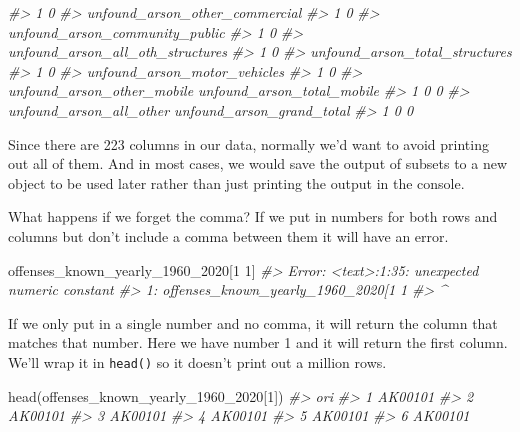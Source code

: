 \documentclass[
]{krantz}
\makeatletter
\newenvironment{Shaded}{\begin{snugshade}}{\end{snugshade}}
\newcommand{\CommentTok}[1]{\textcolor[rgb]{0.37,0.37,0.37}{\textit{#1}}}
\newcommand{\DecValTok}[1]{\textcolor[rgb]{0.06,0.06,0.06}{#1}}
\newcommand{\FunctionTok}[1]{\textcolor[rgb]{0,0,0}{#1}}
\newcommand{\NormalTok}[1]{#1}
\newenvironment{kframe}{%
\medskip{}
\setlength{\fboxsep}{.8em}
 \def\at@end@of@kframe{}%
 \ifinner\ifhmode%
  \def\at@end@of@kframe{\end{minipage}}%
  \begin{minipage}{\columnwidth}%
 \fi\fi%
 \def\FrameCommand##1{\hskip\@totalleftmargin \hskip-\fboxsep
 \colorbox{shadecolor}{##1}\hskip-\fboxsep
     \hskip-\linewidth \hskip-\@totalleftmargin \hskip\columnwidth}%
 \MakeFramed {\advance\hsize-\width
   \@totalleftmargin\z@ \linewidth\hsize
   \@setminipage}}%
 {\par\unskip\endMakeFramed%
 \at@end@of@kframe}
\renewenvironment{Shaded}{\begin{kframe}}{\end{kframe}}
\makeatother
\begin{document}
\begin{Shaded}
\begin{Highlighting}[]
\CommentTok{\#\textgreater{} 1                        0}
\CommentTok{\#\textgreater{}   unfound\_arson\_other\_commercial}
\CommentTok{\#\textgreater{} 1                              0}
\CommentTok{\#\textgreater{}   unfound\_arson\_community\_public}
\CommentTok{\#\textgreater{} 1                              0}
\CommentTok{\#\textgreater{}   unfound\_arson\_all\_oth\_structures}
\CommentTok{\#\textgreater{} 1                                0}
\CommentTok{\#\textgreater{}   unfound\_arson\_total\_structures}
\CommentTok{\#\textgreater{} 1                              0}
\CommentTok{\#\textgreater{}   unfound\_arson\_motor\_vehicles}
\CommentTok{\#\textgreater{} 1                            0}
\CommentTok{\#\textgreater{}   unfound\_arson\_other\_mobile unfound\_arson\_total\_mobile}
\CommentTok{\#\textgreater{} 1                          0                          0}
\CommentTok{\#\textgreater{}   unfound\_arson\_all\_other unfound\_arson\_grand\_total}
\CommentTok{\#\textgreater{} 1                       0                         0}
\end{Highlighting}
\end{Shaded}

Since there are 223 columns in our data, normally we'd want to avoid printing out all of them. And in most cases, we would save the output of subsets to a new object to be used later rather than just printing the output in the console.

What happens if we forget the comma? If we put in numbers for both rows and columns but don't include a comma between them it will have an error.

\begin{Shaded}
\begin{Highlighting}[]
\NormalTok{offenses\_known\_yearly\_1960\_2020[}\DecValTok{1} \DecValTok{1}\NormalTok{]}
\CommentTok{\#\textgreater{} Error: \textless{}text\textgreater{}:1:35: unexpected numeric constant}
\CommentTok{\#\textgreater{} 1: offenses\_known\_yearly\_1960\_2020[1 1}
\CommentTok{\#\textgreater{}                                       \^{}}
\end{Highlighting}
\end{Shaded}

If we only put in a single number and no comma, it will return the column that matches that number. Here we have number 1 and it will return the first column. We'll wrap it in \texttt{head()} so it doesn't print out a million rows.

\begin{Shaded}
\begin{Highlighting}[]
\FunctionTok{head}\NormalTok{(offenses\_known\_yearly\_1960\_2020[}\DecValTok{1}\NormalTok{])}
\CommentTok{\#\textgreater{}       ori}
\CommentTok{\#\textgreater{} 1 AK00101}
\CommentTok{\#\textgreater{} 2 AK00101}
\CommentTok{\#\textgreater{} 3 AK00101}
\CommentTok{\#\textgreater{} 4 AK00101}
\CommentTok{\#\textgreater{} 5 AK00101}
\CommentTok{\#\textgreater{} 6 AK00101}
\end{Highlighting}
\end{Shaded}
\end{document}
